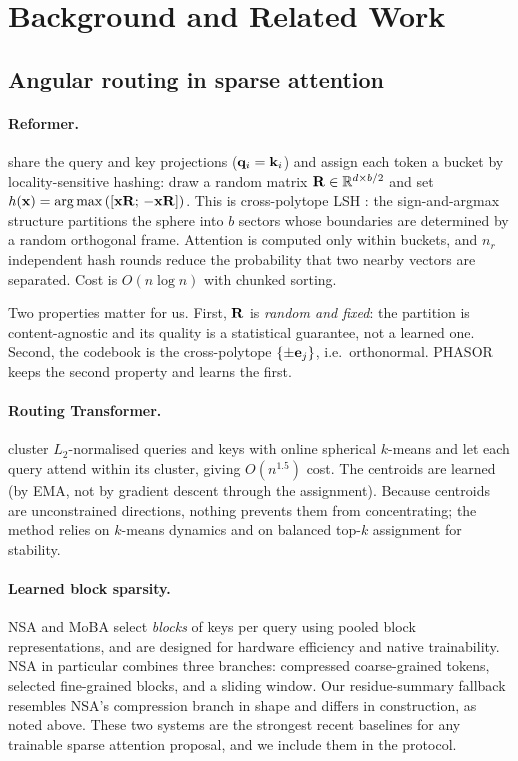 \section{Background and Related Work}
\label{sec:related}

\subsection{Angular routing in sparse attention}

\paragraph{Reformer.} \citet{kitaev2020reformer} share the query and key projections ($\mathbf{q}_i = \mathbf{k}_i$) and assign each token a bucket by locality-sensitive hashing: draw a random matrix $\mathbf{R} \in \mathbb{R}^{d \times b/2}$ and set $h(\mathbf{x}) = \arg\max\left([\mathbf{x}\mathbf{R};\, -\mathbf{x}\mathbf{R}]\right)$. This is cross-polytope LSH \citep{andoni2015crosspolytope}: the sign-and-argmax structure partitions the sphere into $b$ sectors whose boundaries are determined by a random orthogonal frame. Attention is computed only within buckets, and $n_r$ independent hash rounds reduce the probability that two nearby vectors are separated. Cost is $O(n \log n)$ with chunked sorting.

Two properties matter for us. First, $\mathbf{R}$ is \emph{random and fixed}: the partition is content-agnostic and its quality is a statistical guarantee, not a learned one. Second, the codebook is the cross-polytope $\{\pm \mathbf{e}_j\}$, i.e.\ orthonormal. PHASOR keeps the second property and learns the first.

\paragraph{Routing Transformer.} \citet{roy2021routing} cluster $L_2$-normalised queries and keys with online spherical $k$-means and let each query attend within its cluster, giving $O(n^{1.5})$ cost. The centroids are learned (by EMA, not by gradient descent through the assignment). Because centroids are unconstrained directions, nothing prevents them from concentrating; the method relies on $k$-means dynamics and on balanced top-$k$ assignment for stability.

\paragraph{Learned block sparsity.} NSA \citep{yuan2025nsa} and MoBA \citep{lu2025moba} select \emph{blocks} of keys per query using pooled block representations, and are designed for hardware efficiency and native trainability. NSA in particular combines three branches: compressed coarse-grained tokens, selected fine-grained blocks, and a sliding window. Our residue-summary fallback resembles NSA's compression branch in shape and differs in construction, as noted above. These two systems are the strongest recent baselines for any trainable sparse attention proposal, and we include them in the protocol.


